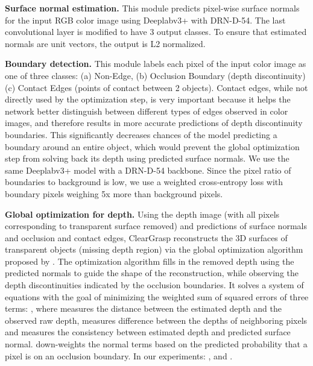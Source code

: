 \documentclass[letterpaper, 10 pt, conference]{ieeeconf}
\newcommand{\myparagraph}[1]{\vspace{0.03in}\noindent\textbf{#1}}
\begin{document}
\myparagraph{Surface normal estimation.}
This module predicts pixel-wise surface normals for the input RGB color image using Deeplabv3+ with DRN-D-54. The last convolutional layer is modified to have 3 output classes. To ensure that estimated normals are unit vectors, the output is L2 normalized. 

\myparagraph{Boundary detection.}
This module labels each pixel of the input color image as one of three classes: (a) Non-Edge, (b) Occlusion Boundary (depth discontinuity) (c) Contact Edges (points of contact between 2 objects). Contact edges, while not directly used by the optimization step, is very important because it helps the network better distinguish between different types of edges observed in color images, and therefore results in more accurate predictions of depth discontinuity boundaries.
This significantly decreases chances of the model predicting a boundary around an entire object, which would prevent the global optimization step from solving back its depth using predicted surface normals.   
We use the same Deeplabv3+ model with a DRN-D-54 backbone. Since the pixel ratio of boundaries to background is low, we use a weighted cross-entropy loss with boundary pixels weighing 5x more than background pixels. 

\myparagraph{Global optimization for depth.}
Using the depth image (with all pixels corresponding to transparent surface removed) and predictions of surface normals and occlusion and contact edges, ClearGrasp reconstructs the 3D surfaces of transparent objects (missing depth region) via the global optimization algorithm proposed by \citet{zhang2018deepdepth}. 
The optimization algorithm fills in the removed depth using the predicted normals to guide the shape of the reconstruction, while observing the depth discontinuities indicated by the occlusion boundaries.
It solves a system of equations with the goal of minimizing the weighted sum of squared errors of three terms:
, where  measures the distance between the estimated depth and the observed raw depth,  measures difference between the depths of neighboring pixels and  measures the consistency between estimated depth and predicted surface normal.  down-weights the normal terms based on the predicted probability that a pixel is on an occlusion boundary. In our experiments: ,  and .
\end{document}
